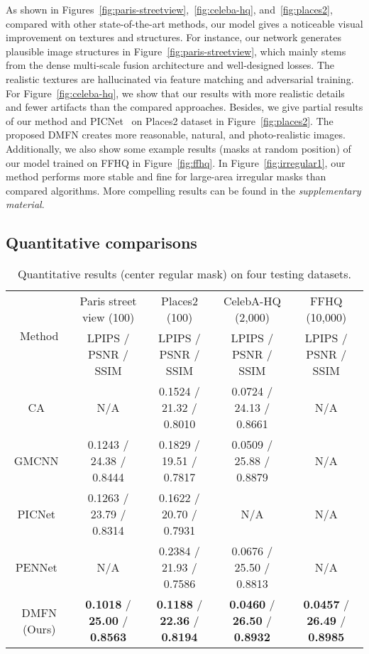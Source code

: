 \documentclass[journal]{IEEEtran}
\begin{document}
As shown in Figures~\ref{fig:paris-streetview},~\ref{fig:celeba-hq}, and~\ref{fig:places2}, compared with other state-of-the-art methods, our model gives a noticeable visual improvement on textures and structures. For instance, our network generates plausible image structures in Figure~\ref{fig:paris-streetview}, which mainly stems from the dense multi-scale fusion architecture and well-designed losses. The realistic textures are hallucinated via feature matching and adversarial training. For Figure~\ref{fig:celeba-hq}, we show that our results with more realistic details and fewer artifacts than the compared approaches. Besides, we give partial results of our method and PICNet~\cite{PICNet} on Places2 dataset in Figure~\ref{fig:places2}. The proposed DMFN creates more reasonable, natural, and photo-realistic images. Additionally, we also show some example results (masks at random position) of our model trained on FFHQ in Figure~\ref{fig:ffhq}. In Figure~\ref{fig:irregular1}, our method performs more stable and fine for large-area irregular masks than compared algorithms. More compelling results can be found in the \emph{supplementary material}.

\subsection{Quantitative comparisons}
\begin{table*}[htpb]
	\centering
	\caption{Quantitative results (center regular mask) on four testing datasets.}
	\label{tab:quantitative-results}
	\begin{tabular}{|c|c|c|c|c|}
		\hline
		\multirow{2}{*}{Method} & Paris street view (100) & Places2 (100) & CelebA-HQ (2,000) & FFHQ (10,000) \\
		\cline{2-5}
		& LPIPS / PSNR / SSIM & LPIPS / PSNR / SSIM & LPIPS / PSNR / SSIM & LPIPS / PSNR / SSIM \\
		\hline
		CA~\cite{contextual-attention} & N/A & 0.1524 / 21.32 / 0.8010 & 0.0724 / 24.13 / 0.8661 & N/A \\
		GMCNN~\cite{GMCNN} & 0.1243 / 24.38 / 0.8444  & 0.1829 / 19.51 / 0.7817 & 0.0509 / 25.88 / 0.8879 & N/A \\
		PICNet~\cite{PICNet} & 0.1263 / 23.79 / 0.8314 & 0.1622 / 20.70 / 0.7931 & N/A & N/A \\
		PENNet~\cite{PEN-Net} & N/A & 0.2384 / 21.93 / 0.7586 & 0.0676 / 25.50 / 0.8813 & N/A \\
		DMFN (Ours) & \textbf{0.1018} / \textbf{25.00} / \textbf{0.8563} & \textbf{0.1188} / \textbf{22.36} / \textbf{0.8194} & \textbf{0.0460} / \textbf{26.50} / \textbf{0.8932} & \textbf{0.0457} / \textbf{26.49} / \textbf{0.8985} \\
		\hline
	\end{tabular}
\end{table*}
\end{document}
